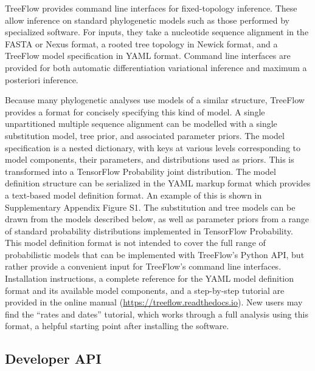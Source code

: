 \documentclass{article}
\begin{document}
TreeFlow provides command line interfaces for fixed-topology inference. These allow inference on standard phylogenetic models such as those performed by specialized software. For inputs, they take a nucleotide sequence alignment in the FASTA or Nexus format, a rooted tree topology in Newick format, and a TreeFlow model specification in YAML format. Command line interfaces are provided for both automatic differentiation variational inference and maximum a posteriori inference.

Because many phylogenetic analyses use models of a similar structure, TreeFlow provides a format for concisely specifying this kind of model. A single unpartitioned multiple sequence alignment can be modelled with a single substitution model, tree prior, and associated parameter priors. The model specification is a nested dictionary, with keys at various levels corresponding to model components, their parameters, and distributions used as priors. This is transformed into a TensorFlow Probability joint distribution. The model definition structure can be serialized in the YAML markup format which provides a text-based model definition format. An example of this is shown in Supplementary Appendix Figure S1. The substitution and tree models can be drawn from the models described below, as well as parameter priors from a range of standard probability distributions implemented in TensorFlow Probability. This model definition format is not intended to cover the full range of probabilistic models that can be implemented with TreeFlow's Python API, but rather provide a convenient input for TreeFlow's command line interfaces. Installation instructions, a complete reference for the YAML model definition format and its available model components, and a step-by-step tutorial are provided in the online manual (\url{https://treeflow.readthedocs.io}). New users may find the ``rates and dates'' tutorial, which works through a full analysis using this format, a helpful starting point after installing the software.

\subsection{Developer API}
\end{document}
